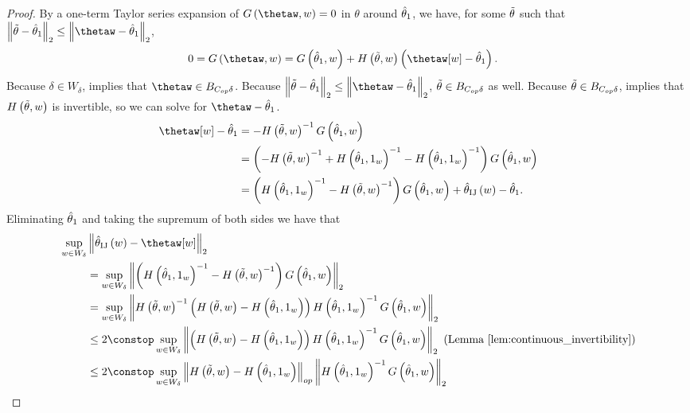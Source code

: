 \begin{proof}
By a one-term Taylor series expansion of $G\left(\thetaw,w\right)=0$
in $\theta$ around $\hat{\theta}_{1}$, we have, for some $\tilde{\theta}$
such that $\norm{\thetawiggle-\thetaone}_{2}\le\norm{{{\thetaw}}-\thetaone}_{2}$,
\begin{align*}
0=G\left(\thetaw,w\right) & =G\left(\thetaone,w\right)+H\left(\thetawiggle,w\right)\left(\thetaw[w]-\thetaone\right).
\end{align*}
Because $\delta\in W_{\delta}$, 
implies that $\thetaw\in\thetadeltaball$. Because $\norm{\thetawiggle-\thetaone}_{2}\le\norm{{{\thetaw}}-\thetaone}_{2}$,
$\tilde{\theta}\in B_{C_{op}\delta}$ as well. Because $\tilde{\theta}\in B_{C_{op}\delta}$,
 implies that $H\left(\tilde{\theta},w\right)$
is invertible, so we can solve for $\thetaw-\thetaone$.
\begin{align*}
\thetaw[w]-\thetaone & =-H\left(\thetawiggle,w\right)^{-1}G\left(\thetaone,w\right)\\
 & =\left(-H\left(\thetawiggle,w\right)^{-1}+H\left(\thetaone,\onevec\right)^{-1}-H\left(\thetaone,\onevec\right)^{-1}\right)G\left(\thetaone,w\right)\\
 & =\left(H\left(\thetaone,\onevec\right)^{-1}-H\left(\thetawiggle,w\right)^{-1}\right)G\left(\thetaone,w\right)+\thetaij\left(w\right)-\thetaone.
\end{align*}
Eliminating $\hat{\theta}_{1}$ and taking the supremum of both sides we
have that
\begin{align*}
\sup_{w\in W_{\delta}} & \norm{\thetaij\left(w\right)-{{\thetaw[w]}}}_{2}\\
 & =\sup_{w\in W_{\delta}}\norm{\left(H\left(\thetaone,\onevec\right)^{-1}-H\left(\thetawiggle,w\right)^{-1}\right)G\left(\thetaone,w\right)}_{2}\\
 & =\sup_{w\in W_{\delta}}\norm{H\left(\thetawiggle,w\right)^{-1}\left(H\left(\thetawiggle,w\right)-H\left(\thetaone,\onevec\right)\right)H\left(\thetaone,\onevec\right)^{-1}G\left(\thetaone,w\right)}_{2}\\
 & \le2\constop\sup_{w\in W_{\delta}}\norm{\left(H\left(\thetawiggle,w\right)-H\left(\thetaone,\onevec\right)\right)H\left(\thetaone,\onevec\right)^{-1}G\left(\thetaone,w\right)}_{2}\textrm{ (Lemma \ref{lem:continuous_invertibility})}\\
 & \le2\constop\sup_{w\in W_{\delta}}\norm{H\left(\thetawiggle,w\right)-H\left(\thetaone,\onevec\right)}_{op}\norm{H\left(\thetaone,\onevec\right)^{-1}G\left(\thetaone,w\right)}_{2}\\

\end{align*}
\end{proof}
